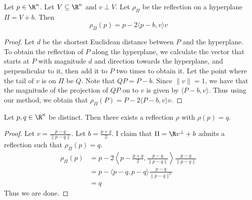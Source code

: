 \documentclass[a4paper]{article}
\begin{document}
\begin{lmm}{}{} Let $p\in\R^n$. Let $V\subseteq\R^n$ and $v\perp V$. Let $\rho_\Pi$ be the reflection on a hyperplane $\Pi=V+b$. Then $$\rho_\Pi(p)=p-2\langle p-b, v\rangle v$$
\begin{proof}
Let $d$ be the shortest Euclidean distance between $P$ and the hyperplane. To obtain the reflection of $P$ along the hyperplane, we calculate the vector that starts at $P$ with magnitude $d$ and direction towards the hyperplane, and perpendicular to it, then add it to $P$ two times to obtain it. \linebreak\linebreak
Let the point where the tail of $v$ is on $\Pi$ be $Q$. Note that $QP=P-b$. Since $\|v\|=1$, we have that the magnitude of the projection of $QP$ on to $v$ is given by $\langle P-b,v\rangle$. Thus using our method, we obtain that $\rho_\Pi(P)=P-2\langle P-b,v\rangle v$. 
\end{proof}
\end{lmm}

\begin{lmm}{}{} Let $p,q\in\R^n$ be distinct. Then there exists a reflection $\rho$ with $\rho(p)=q$. 
\begin{proof}
Let $v=\frac{p-q}{\|p-q\|}$. Let $b=\frac{p+q}{2}$. I claim that $\Pi=\R v^\perp+b$ admits a reflection such that $\rho_\Pi(p)=q$. 
\begin{align*}
\rho_\Pi(p)&=p-2\left\langle p-\frac{p+q}{2},\frac{p-q}{\|p-q\|}\right\rangle \frac{p-q}{\|p-q\|}\\
&=p-\langle p-q,p-q\rangle\frac{p-q}{\|p-q\|^2}\\
&=q
\end{align*}
Thus we are done. 
\end{proof}
\end{lmm}
\end{document}
